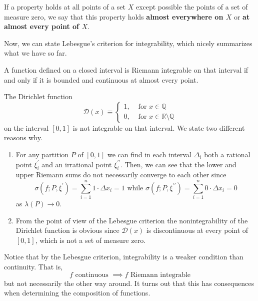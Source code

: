 \documentclass{article}
\begin{document}
      \begin{definition}
        If a property holds at all points of a set $X$ except possible the points of a set of measure zero, we say that this property holds \textbf{almost everywhere on $X$} or \textbf{at almost every point of $X$}. 
      \end{definition}

      Now, we can state Lebesgue's criterion for integrability, which nicely summarizes what we have so far. 

      \begin{theorem}
      A function defined on a closed interval is Riemann integrable on that interval if and only if it is bounded and continuous at almost every point. 
      \end{theorem}

    \begin{example}
    The Dirichlet function
    \[\mathcal{D}(x) \equiv \begin{cases}
    1, & \text{ for } x \in \mathbb{Q} \\
    0, & \text{ for } x \in \mathbb{R} \setminus \mathbb{Q}
    \end{cases}\]
    on the interval $[0,1]$ is not integrable on that interval. We state two different reasons why. 
    \begin{enumerate}
      \item For any partition $P$ of $[0,1]$ we can find in each interval $\Delta_i$ both a rational point $\xi^\prime_i$ and an irrational point $\xi_i^{\prime\prime}$. Then, we can see that the lower and upper Riemann sums do not necessarily converge to each other since
      \[\sigma(f; P, \xi^\prime) = \sum_{i=1}^n 1 \cdot \Delta x_i = 1 \text{ while } \sigma(f;P, \xi^{\prime\prime}) = \sum_{i=1}^n 0 \cdot \Delta x_i = 0\]
      as $\lambda(P) \rightarrow 0$. 
      \item From the point of view of the Lebesgue criterion the nonintegrability of the Dirichlet function is obvious since $\mathcal{D}(x)$ is discontinuous at every point of $[0, 1]$, which is not a set of measure zero. 
    \end{enumerate}
    \end{example}

      Notice that by the Lebesgue criterion, integrability is a weaker condition than continuity. That is, 
      \[f \text{ continuous } \implies f \text{ Riemann integrable}\]
      but not necessarily the other way around. It turns out that this has consequences when determining the composition of functions. 
\end{document}
